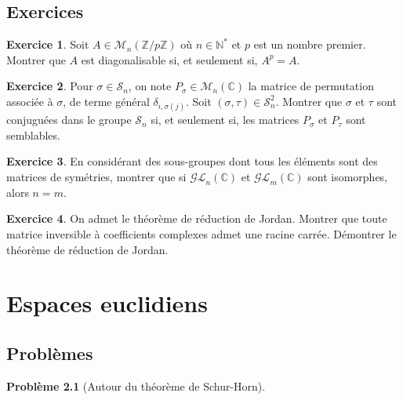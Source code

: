 \documentclass[french]{book}
\newcommand{\N}{\mathbb{N}}
\newcommand{\Z}{\mathbb{Z}}
\newcommand{\C}{\mathbb{C}}
\newcommand{\st}{^*}
\theoremstyle{definition}
\newtheorem{ex}{Exercice}[chapter]
\newtheorem{pro}{Problème}[chapter]
\begin{document}
\section{Exercices}

\begin{ex}
	Soit $A\in\mathcal{M}_n(\Z/p\Z)$ où $n\in\N\st$ et $p$ est un nombre premier. Montrer que $A$ est diagonalisable si, et seulement si, $A^p=A$.
\end{ex}

\begin{ex}
	Pour $\sigma\in\mathcal{S}_n$, on note $P_\sigma\in\mathcal{M}_n(\C)$ la matrice de permutation associée à $\sigma$, de terme général $\delta_{i,\sigma(j)}$. Soit $(\sigma,\tau)\in\mathcal{S}_n^2$. Montrer que $\sigma$ et $\tau$ sont conjuguées dans le groupe $\mathcal{S}_n$ si, et seulement si, les matrices $P_\sigma$ et $P_\tau$ sont semblables.
\end{ex}

\begin{ex}
	En considérant des sous-groupes dont tous les éléments sont des matrices de symétries, montrer que si $\mathcal{GL}_n(\C)$ et $\mathcal{GL}_m(\C)$ sont isomorphes, alors $n=m$.
\end{ex}

\begin{ex}
	On admet le théorème de réduction de Jordan. Montrer que toute matrice inversible à coefficients complexes admet une racine carrée. Démontrer le théorème de réduction de Jordan.
\end{ex}

\chapter{Espaces euclidiens}

\section{Problèmes}

\begin{pro}[Autour du théorème de Schur-Horn]
	
\end{pro}
\end{document}
